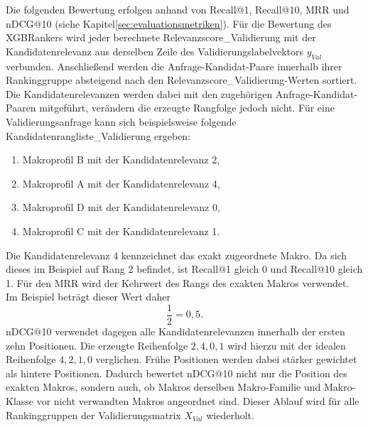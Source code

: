 Die folgenden Bewertung erfolgen anhand von Recall@1, Recall@10, MRR und nDCG@10 (siehe Kapitel\ref{sec:evaluationsmetriken}). 
Für die Bewertung des XGBRankers wird jeder berechnete Relevanzscore\_Validierung mit der Kandidatenrelevanz aus derselben Zeile des Validierungslabelvektors \(y_{Val}\) verbunden.
Anschließend werden die Anfrage-Kandidat-Paare innerhalb ihrer Rankinggruppe absteigend nach den Relevanzscore\_Validierung-Werten sortiert. 
Die Kandidatenrelevanzen werden dabei mit den zugehörigen Anfrage-Kandidat-Paaren mitgeführt, verändern die erzeugte Rangfolge jedoch nicht. 
Für eine Validierungsanfrage kann sich beispielsweise folgende Kandidatenrangliste\_Validierung ergeben: 

\begin{enumerate} 
    \item Makroprofil B mit der Kandidatenrelevanz 2, 
    \item Makroprofil A mit der Kandidatenrelevanz 4, 
    \item Makroprofil D mit der Kandidatenrelevanz 0, 
    \item Makroprofil C mit der Kandidatenrelevanz 1. 
\end{enumerate} 

Die Kandidatenrelevanz 4 kennzeichnet das exakt zugeordnete Makro. Da sich dieses im Beispiel auf Rang 2 befindet, ist Recall@1 gleich 0 und Recall@10 gleich 1.
Für den MRR wird der Kehrwert des Rangs des exakten Makros verwendet. Im Beispiel beträgt dieser Wert daher \[ \frac{1}{2}=0{,}5. \] nDCG@10 verwendet dagegen alle Kandidatenrelevanzen innerhalb der ersten zehn Positionen. 
Die erzeugte Reihenfolge \(2,4,0,1\) wird hierzu mit der idealen Reihenfolge \(4,2,1,0\) verglichen. Frühe Positionen werden dabei stärker gewichtet als hintere Positionen. Dadurch bewertet nDCG@10 nicht nur die Position des exakten Makros, 
sondern auch, ob Makros derselben Makro-Familie und Makro-Klasse vor nicht verwandten Makros angeordnet sind. Dieser Ablauf wird für alle Rankinggruppen der Validierungsmatrix \(X_{Val}\) wiederholt. 

